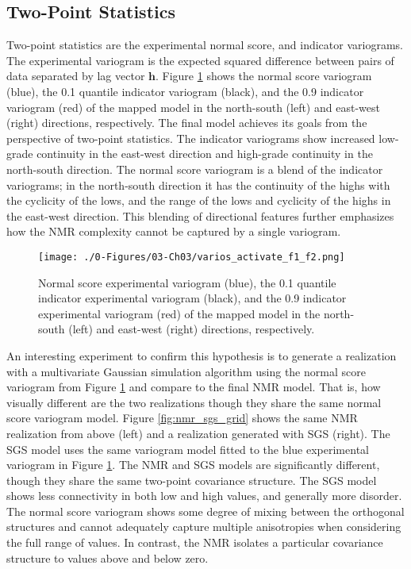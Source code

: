 \FloatBarrier
\subsection{Two-Point Statistics}
\label{subsec:03twopt}

Two-point statistics are the experimental normal score, and indicator variograms. The experimental variogram is the expected squared difference between pairs of data separated by lag vector $\mathbf{h}$. Figure \ref{fig:varios_activate_f1_f2} shows the normal score variogram (blue), the 0.1 quantile indicator variogram (black), and the 0.9 indicator variogram (red) of the mapped model in the north-south (left) and east-west (right) directions, respectively. The final model achieves its goals from the perspective of two-point statistics. The indicator variograms show increased low-grade continuity in the east-west direction and high-grade continuity in the north-south direction. The normal score variogram is a blend of the indicator variograms; in the north-south direction it has the continuity of the highs with the cyclicity of the lows, and the range of the lows and cyclicity of the highs in the east-west direction. This blending of directional features further emphasizes how the \gls{NMR} complexity cannot be captured by a single variogram.

\begin{figure}[htb!]
    \centering
    \texttt{[image: ./0-Figures/03-Ch03/varios\_activate\_f1\_f2.png]}
    \caption{Normal score experimental variogram (blue), the 0.1 quantile indicator experimental variogram (black), and the 0.9 indicator experimental variogram (red) of the mapped model in the north-south (left) and east-west (right) directions, respectively.}
    \label{fig:varios_activate_f1_f2}
\end{figure}

An interesting experiment to confirm this hypothesis is to generate a realization with a multivariate Gaussian simulation algorithm using the normal score variogram from Figure \ref{fig:varios_activate_f1_f2} and compare to the final \gls{NMR} model. That is, how visually different are the two realizations though they share the same normal score variogram model. Figure \ref{fig:nmr_sgs_grid} shows the same \gls{NMR} realization from above (left) and a realization generated with \gls{SGS} (right). The \gls{SGS} model uses the same variogram model fitted to the blue experimental variogram in Figure \ref{fig:varios_activate_f1_f2}. The \gls{NMR} and \gls{SGS} models are significantly different, though they share the same two-point covariance structure. The \gls{SGS} model shows less connectivity in both low and high values, and generally more disorder. The normal score variogram shows some degree of mixing between the orthogonal structures and cannot adequately capture multiple anisotropies when considering the full range of values. In contrast, the \gls{NMR} isolates a particular covariance structure to values above and below zero.

